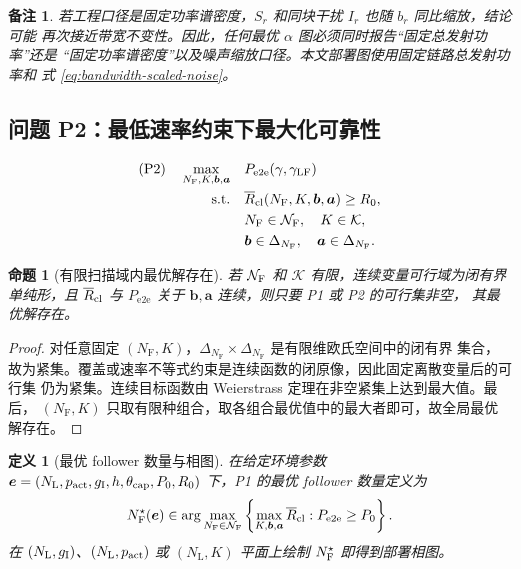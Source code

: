 \documentclass[UTF8,a4paper,11pt]{ctexart}
\newtheorem{definition}{定义}[section]
\newtheorem{proposition}{命题}[section]
\newtheorem{remark}{备注}[section]
\newcommand{\NL}{N_{\mathrm L}}
\newcommand{\NF}{N_{\mathrm F}}
\newcommand{\thetac}{\theta_{\mathrm{cap}}}
\newcommand{\Pe}{P_{\mathrm{e2e}}}
\newcommand{\Rbar}{\overline R}
\newcommand{\bvec}{\bm b}
\newcommand{\avec}{\bm a}
\newcommand{\Simplex}{\Delta}
\begin{document}
\begin{remark}
若工程口径是固定功率谱密度，$S_r$ 和同块干扰 $I_r$ 也随 $b_r$ 同比缩放，结论可能
再次接近带宽不变性。因此，任何最优 $\alpha$ 图必须同时报告“固定总发射功率”还是
“固定功率谱密度”以及噪声缩放口径。本文部署图使用固定链路总发射功率和
式 \eqref{eq:bandwidth-scaled-noise}。
\end{remark}

\subsection{问题 P2：最低速率约束下最大化可靠性}

\begin{equation}
\begin{aligned}
 \mathrm{(P2)}\quad
 \max_{\NF,K,\bvec,\avec}\quad
 &\Pe(\gamma,\gamma_{\rm LF})\\
 \text{s.t.}\quad
 &\Rbar_{\rm cl}(\NF,K,\bvec,\avec)\geq R_0,\\
 &\NF\in\mathcal N_{\rm F},\quad K\in\mathcal K,\\
 &\bvec\in\Simplex_{\NF},\quad\avec\in\Simplex_{\NF}.
\end{aligned}
\label{eq:p2}
\end{equation}

\begin{proposition}[有限扫描域内最优解存在]
\label{prop:opt-exists}
若 $\mathcal N_{\rm F}$ 和 $\mathcal K$ 有限，连续变量可行域为闭有界单纯形，且
$\Rbar_{\rm cl}$ 与 $\Pe$ 关于 $\bvec,\avec$ 连续，则只要 P1 或 P2 的可行集非空，
其最优解存在。
\end{proposition}

\begin{proof}
对任意固定 $(\NF,K)$，$\Simplex_{\NF}\times\Simplex_{\NF}$ 是有限维欧氏空间中的闭有界
集合，故为紧集。覆盖或速率不等式约束是连续函数的闭原像，因此固定离散变量后的可行集
仍为紧集。连续目标函数由 Weierstrass 定理在非空紧集上达到最大值。最后，
$(\NF,K)$ 只取有限种组合，取各组合最优值中的最大者即可，故全局最优解存在。
\end{proof}

\begin{definition}[最优 follower 数量与相图]
在给定环境参数
$\bm e=(\NL,p_{\rm act},g_{\rm I},h,\thetac,P_0,R_0)$ 下，P1 的最优 follower 数量定义为
\begin{equation}
 N_{\rm F}^{\star}(\bm e)
 \in
 \arg\max_{\NF\in\mathcal N_{\rm F}}
 \left\{
 \max_{K,\bvec,\avec}
 \Rbar_{\rm cl}:
 \Pe\geq P_0
 \right\}.
 \label{eq:nf-star}
\end{equation}
在 $(\NL,g_{\rm I})$、$(\NL,p_{\rm act})$ 或 $(\NL,K)$ 平面上绘制
$N_{\rm F}^{\star}$ 即得到部署相图。
\end{definition}
\end{document}
